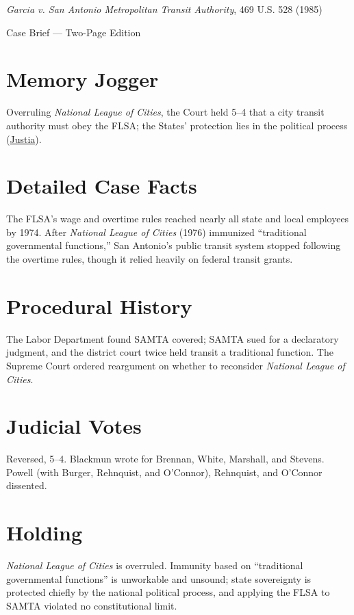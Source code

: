 \documentclass[12pt]{article}
\begin{document}
\begin{center}
{\LARGE \textit{Garcia v. San Antonio Metropolitan Transit Authority}, 469 U.S. 528 (1985)\par}
\vspace{0.5em}
{\large Case Brief --- Two-Page Edition\par}
\end{center}

\section{Memory Jogger}
Overruling \textit{National League of Cities}, the Court held 5--4 that a city transit authority must obey the FLSA; the States' protection lies in the political process (\href{https://supreme.justia.com/cases/federal/us/469/528/}{Justia}).

\section{Detailed Case Facts}
The FLSA's wage and overtime rules reached nearly all state and local employees by 1974. After \textit{National League of Cities} (1976) immunized ``traditional governmental functions,'' San Antonio's public transit system stopped following the overtime rules, though it relied heavily on federal transit grants.

\section{Procedural History}
The Labor Department found SAMTA covered; SAMTA sued for a declaratory judgment, and the district court twice held transit a traditional function. The Supreme Court ordered reargument on whether to reconsider \textit{National League of Cities}.

\section{Judicial Votes}
Reversed, 5--4. Blackmun wrote for Brennan, White, Marshall, and Stevens. Powell (with Burger, Rehnquist, and O'Connor), Rehnquist, and O'Connor dissented.

\section{Holding}
\textit{National League of Cities} is overruled. Immunity based on ``traditional governmental functions'' is unworkable and unsound; state sovereignty is protected chiefly by the national political process, and applying the FLSA to SAMTA violated no constitutional limit.
\end{document}
